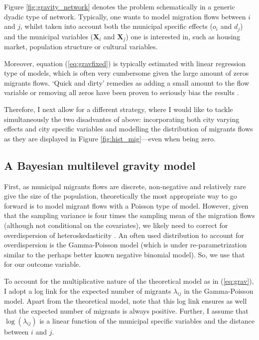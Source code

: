 \documentclass[fleqn,10pt]{SelfArx} %
\begin{document}
        Figure \ref{fig:gravity_network} denotes the problem schematically in a
        generic dyadic type of network. Typically, one wants to model migration
        flows between $i$ and $j$, whilst taken into account both the municipal
        specific effects ($o_i$ and $d_j$) and the municipal variables
        ($\mathbf{X}_i$ and $\mathbf{X}_j$) one is interested in, such as
        housing market, population structure or cultural variables.

        Moreover, equation (\ref{eq:gravfixed}) is typically estimated with
        linear regression type of models, which is often very cumbersome given
        the large amount of zeros migrants flows. `Quick and dirty' remedies as
        adding a small amount to the flow variable or removing all zeros have
        been proven to seriously bias the results \citep{linders2006estimation,
          burger2009specification}.


        Therefore, I next allow for a different strategy, where I would like to
        tackle simultaneously the two disadvantes of above: incorporating both
        city varying effects and city specific variables and modelling the
        distribution of migrants flows as they are displayed in Figure
        \ref{fig:hist_mig}---even when being zero.

        \subsection{A Bayesian multilevel gravity model}

        First, as municipal migrants flows are discrete, non-negative and
        relatively rare give the size of the population, theoretically the most
        appropriate way to go forward is to model migrant flows with a Poisson
        type of model. However, given that the sampling variance is four times
        the sampling mean of the migration flows (although not conditional on
        the covariates), we likely need to correct for overdispersion of
        heteroskedasticity \citep[][states that heteroskedasticity (rather than
        the presence of too many zeros) is responsible for the main source of
        bias within gravity models.]{silva2006log}. An often used distribution
        to account for overdispersion is the Gamma-Poisson model (which is under
        re-parametrization similar to the perhaps better known negative binomial
        model). So, we use that for our outcome variable.

        To account for the multiplicative nature of the theoretical model as in
        (\ref{eq:grav}), I adopt a log link for the expected number of migrants
        $\lambda_{ij}$ in the Gamma-Poisson model.  Apart from the theoretical
        model, note that this log link ensures as well that the expected number
        of migrants is always positive.  Further, I assume that
        $\log(\lambda_{ij})$ is a linear function of the municipal specific
        variables and the distance between $i$ and $j$.
\end{document}
